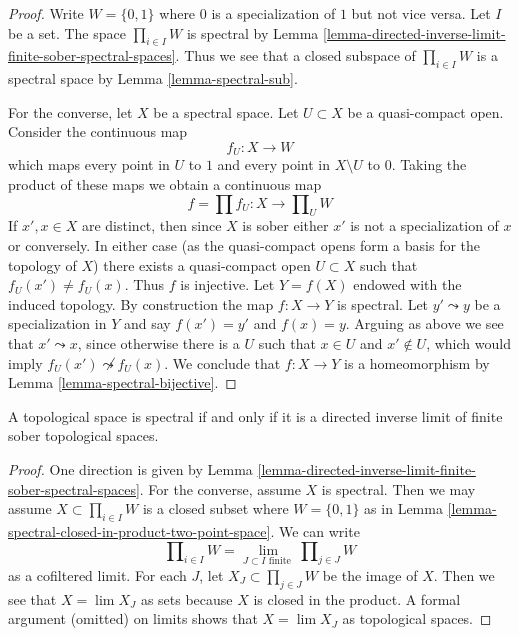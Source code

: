 \begin{proof}
Write $W = \{0, 1\}$ where $0$ is a specialization of $1$ but not vice versa.
Let $I$ be a set. The space $\prod_{i \in I} W$ is spectral by
Lemma \ref{lemma-directed-inverse-limit-finite-sober-spectral-spaces}.
Thus we see that a closed subspace of $\prod_{i \in I} W$ is
a spectral space by Lemma \ref{lemma-spectral-sub}.

\medskip\noindent
For the converse, let $X$ be a spectral space. Let $U \subset X$ be a
quasi-compact open. Consider the continuous map
$$
f_U : X \longrightarrow W
$$
which maps every point in $U$ to $1$ and every point in $X \setminus U$ to $0$.
Taking the product of these maps we obtain a continuous map
$$
f = \prod f_U : X \longrightarrow \prod\nolimits_U W
$$
If $x', x \in X$ are distinct, then since $X$ is sober either $x'$
is not a specialization of $x$ or conversely. In either case (as the
quasi-compact opens form a basis for the topology of $X$) there
exists a quasi-compact open $U \subset X$ such that $f_U(x') \not = f_U(x)$.
Thus $f$ is injective. Let $Y = f(X)$ endowed with the induced topology.
By construction the map $f : X \to Y$ is spectral.
Let $y' \leadsto y$ be a specialization in $Y$ and say
$f(x') = y'$ and $f(x) = y$. Arguing as above we see that
$x' \leadsto x$, since otherwise there is a $U$ such that
$x \in U$ and $x' \not \in U$, which would imply
$f_U(x') \not \leadsto f_U(x)$.
We conclude that $f : X \to Y$ is a homeomorphism by
Lemma \ref{lemma-spectral-bijective}.
\end{proof}

\begin{lemma}
\label{lemma-spectral-inverse-limit-finite-sober-spaces}
A topological space is spectral if and only if it is a directed
inverse limit of finite sober topological spaces.
\end{lemma}

\begin{proof}
One direction is given by
Lemma \ref{lemma-directed-inverse-limit-finite-sober-spectral-spaces}.
For the converse, assume $X$ is spectral. Then we
may assume $X \subset \prod_{i \in I} W$ is a closed subset
where $W = \{0, 1\}$ as in
Lemma \ref{lemma-spectral-closed-in-product-two-point-space}.
We can write
$$
\prod\nolimits_{i \in I} W =
\lim_{J \subset I\text{ finite }} \prod\nolimits_{j \in J} W
$$
as a cofiltered limit.
For each $J$, let $X_J \subset \prod_{j \in J} W$ be the image of $X$.
Then we see that $X = \lim X_J$ as sets because $X$ is closed in the product.
A formal argument (omitted) on limits shows that $X = \lim X_J$ as topological
spaces.
\end{proof}

